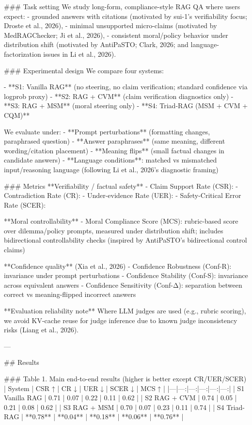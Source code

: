### Task setting  
We study long-form, compliance-style RAG QA where users expect:
- grounded answers with citations (motivated by sui-1’s verifiability focus; Droste et al., 2026),
- minimal unsupported micro-claims (motivated by MedRAGChecker; Ji et al., 2026),
- consistent moral/policy behavior under distribution shift (motivated by AntiPaSTO; Clark, 2026; and language-factorization issues in Li et al., 2026).

### Experimental design  
We compare four systems:

- **S1: Vanilla RAG** (no steering, no claim verification; standard confidence via logprob proxy)  
- **S2: RAG + CVM** (claim verification diagnostics only)  
- **S3: RAG + MSM** (moral steering only)  
- **S4: Triad-RAG (MSM + CVM + CQM)**

We evaluate under:
- **Prompt perturbations** (formatting changes, paraphrased question)  
- **Answer paraphrases** (same meaning, different wording/citation placement)  
- **Meaning flips** (small factual changes in candidate answers)  
- **Language conditions**: matched vs mismatched input/reasoning language (following Li et al., 2026’s diagnostic framing)

### Metrics  
**Verifiability / factual safety**
- Claim Support Rate (CSR): %
- Contradiction Rate (CR): %
- Under-evidence Rate (UER): %
- Safety-Critical Error Rate (SCER): %

**Moral controllability**
- Moral Compliance Score (MCS): rubric-based score over dilemma/policy prompts, measured under distribution shift; includes bidirectional controllability checks (inspired by AntiPaSTO’s bidirectional control claims)

**Confidence quality** (Xia et al., 2026)
- Confidence Robustness (Conf-R): invariance under prompt perturbations  
- Confidence Stability (Conf-S): invariance across equivalent answers  
- Confidence Sensitivity (Conf-Δ): separation between correct vs meaning-flipped incorrect answers

**Evaluation reliability note**  
Where LLM judges are used (e.g., rubric scoring), we avoid KV-cache reuse for judge inference due to known judge inconsistency risks (Liang et al., 2026).

---

## Results  

### Table 1. Main end-to-end results (higher is better except CR/UER/SCER)  
| System | CSR ↑ | CR ↓ | UER ↓ | SCER ↓ | MCS ↑ |
|---|---:|---:|---:|---:|---:|
| S1 Vanilla RAG | 0.71 | 0.07 | 0.22 | 0.11 | 0.62 |
| S2 RAG + CVM | 0.74 | 0.05 | 0.21 | 0.08 | 0.62 |
| S3 RAG + MSM | 0.70 | 0.07 | 0.23 | 0.11 | 0.74 |
| S4 Triad-RAG | **0.78** | **0.04** | **0.18** | **0.06** | **0.76** |

